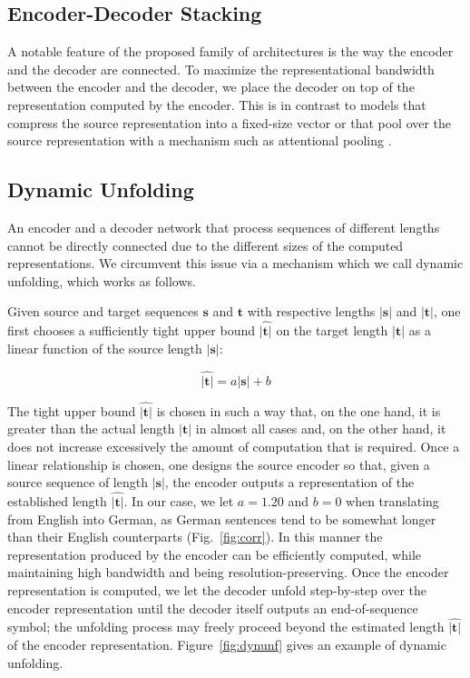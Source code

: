 \subsection{Encoder-Decoder Stacking}
\label{sec:stacking}
A notable feature of the proposed family of architectures is the way the encoder and the decoder are connected. To maximize the representational bandwidth between the encoder and the decoder, we place the decoder on top of the representation computed by the encoder. This is in contrast to models that compress the source representation into a fixed-size vector \citep{kalchbrenner13emnlp,DBLP:conf/nips/SutskeverVL14} or that pool over the source representation with a mechanism such as attentional pooling \citep{DBLP:journals/corr/BahdanauCB14}. 

\subsection{Dynamic Unfolding}
\label{sec:dynunf}
An encoder and a decoder network that process sequences of different lengths cannot be directly connected due to the different sizes of the computed representations. We circumvent this issue via a mechanism which we call dynamic unfolding, which works as follows.

Given source and target sequences $\mathbf{s}$ and $\mathbf{t}$ with respective lengths $|\mathbf{s}|$ and $|\mathbf{t}|$, one first chooses a sufficiently tight upper bound $\hat{|\mathbf{t}|}$ on the target length $|\mathbf{t}|$ as a linear function of the source length $|\mathbf{s}|$:

\begin{equation}
\label{eq:unfold}
\hat{|\mathbf{t}|} = a |\mathbf{s}| + b
\end{equation}

The tight upper bound $\hat{|\mathbf{t}|}$ is chosen in such a way that, on the one hand, it is greater than the actual length $|\mathbf{t}|$ in almost all cases and, on the other hand, it does not increase excessively the  amount of computation that is required. Once a linear relationship is chosen, one designs the source encoder so that, given a source sequence of length $|\mathbf{s}|$, the encoder outputs a representation of the established length $\hat{|\mathbf{t}|}$. In our case, we let $a=1.20$ and $b=0$ when translating from English into German, as German sentences tend to be somewhat longer than their English counterparts (Fig.~\ref{fig:corr}). In this manner the representation produced by the encoder can be efficiently computed, while maintaining high bandwidth and being resolution-preserving. Once the encoder representation is computed, we let the decoder unfold step-by-step over the encoder representation until the decoder itself outputs an end-of-sequence symbol; the unfolding process may freely proceed beyond the estimated length $\hat{|\mathbf{t}|}$ of the encoder representation. Figure~\ref{fig:dynunf} gives an example of dynamic unfolding. 

